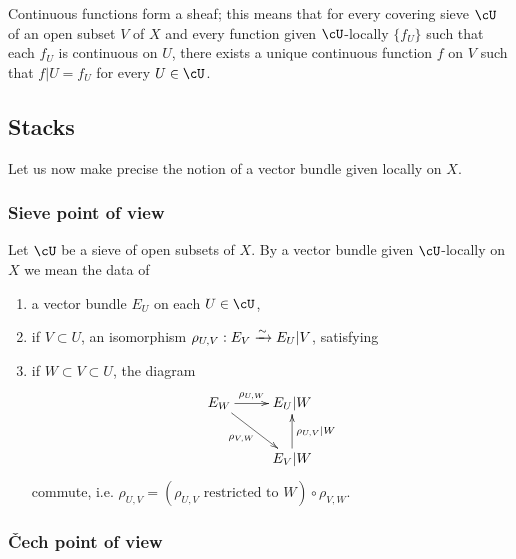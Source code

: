 \subsubsection{}\label{I:1-2-3}

Continuous functions form a sheaf; this means that for every covering
sieve $\cU$ of an open subset $V$ of $X$ and every function given
$\cU$-locally $\{f_U\}$ such that each $f_U$ is continuous on $U$, there
exists a unique continuous function $f$ on $V$ such that $f|U=f_U$ for every
$U\in \cU$.










\subsection{Stacks}\label{I:1-3}

Let us now make precise the notion of a vector bundle given locally on $X$. 





\subsubsection{Sieve point of view}\label{I:1-3-1}

Let $\cU$ be a sieve of open subsets of $X$. By a vector bundle given
$\cU$-locally on $X$ we mean the data of 
\begin{enumerate}[\indent a)]
  \item a vector bundle $E_U$ on each $U\in \cU$, 
  \item if $V\subset U$, an isomorphism $\rho_{U,V} : E_V\xrightarrow\sim E_U|V$, satisfying 
  \item if $W\subset V\subset U$, the diagram 
    \[\xymatrix{
      E_W \ar[r]^-{\rho_{U,W}} \ar[dr]_-{\rho_{V,W}}
        & E_U|W \\
      & E_V|W \ar[u]_-{\rho_{U,V}|W}
    }\]
    commute, i.e. 
    $\rho_{U,V} = (\mbox{$\rho_{U,V}$ restricted to $W$}) \circ \rho_{V,W}$. 
\end{enumerate}





\subsubsection{\v Cech point of view}\label{I:1-3-2}

